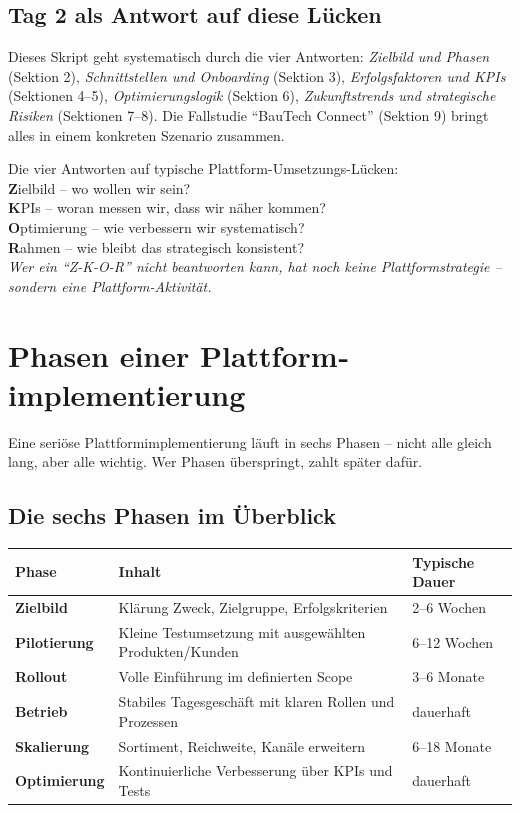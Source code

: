 \documentclass[11pt,a4paper,oneside]{article}
\newcommand{\caveatfontfallback}{\itshape}
\newcommand\caveatfont{\caveatfontfallback}%
\newcommand{\akzent}[1]{{\caveatfont\color{lpAmber}#1}}
\begin{document}
\subsection{Tag 2 als Antwort auf diese Lücken}

Dieses Skript geht systematisch durch die vier Antworten: \emph{Zielbild und Phasen} (Sektion 2), \emph{Schnittstellen und Onboarding} (Sektion 3), \emph{Erfolgsfaktoren und KPIs} (Sektionen 4--5), \emph{Optimierungslogik} (Sektion 6), \emph{Zukunftstrends und strategische Risiken} (Sektionen 7--8). Die Fallstudie ``BauTech Connect'' (Sektion 9) bringt alles in einem konkreten Szenario zusammen.

\begin{eselsbox}[Eselsbrücke: \akzent{Z-K-O-R}]
Die vier Antworten auf typische Plattform-Umsetzungs-Lücken:\\[2pt]
\textbf{Z}ielbild -- wo wollen wir sein?\\
\textbf{K}PIs -- woran messen wir, dass wir näher kommen?\\
\textbf{O}ptimierung -- wie verbessern wir systematisch?\\
\textbf{R}ahmen -- wie bleibt das strategisch konsistent?\\[2pt]
\emph{Wer ein ``Z-K-O-R'' nicht beantworten kann, hat noch keine Plattformstrategie -- sondern eine Plattform-Aktivität.}
\end{eselsbox}

\section{Phasen einer Plattform­implementierung}

Eine seriöse Plattform­implementierung läuft in sechs Phasen -- nicht alle gleich lang, aber alle wichtig. Wer Phasen überspringt, zahlt später dafür.

\subsection{Die sechs Phasen im Überblick}

\begin{tabularx}{\linewidth}{@{}>{\bfseries}lX l@{}}
\toprule
Phase & Inhalt & Typische Dauer \\
\midrule
Zielbild & Klärung Zweck, Zielgruppe, Erfolgskriterien & 2--6 Wochen \\
Pilotierung & Kleine Testumsetzung mit ausgewählten Produkten/Kunden & 6--12 Wochen \\
Rollout & Volle Einführung im definierten Scope & 3--6 Monate \\
Betrieb & Stabiles Tagesgeschäft mit klaren Rollen und Prozessen & dauerhaft \\
Skalierung & Sortiment, Reichweite, Kanäle erweitern & 6--18 Monate \\
Optimierung & Kontinuierliche Verbesserung über KPIs und Tests & dauerhaft \\
\bottomrule
\end{tabularx}
\end{document}
